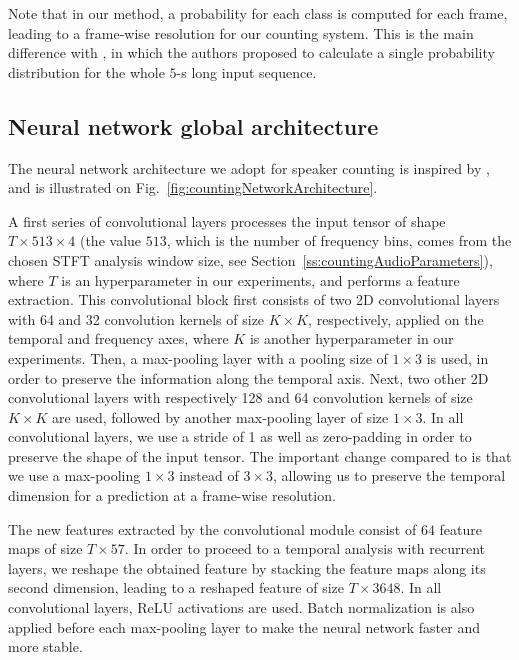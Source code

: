 Note that in our method, a probability for each class is computed for each frame, leading to a frame-wise resolution for our counting system. This is the main difference with \cite{stoter_classification_2018}, in which the authors proposed to calculate a single probability distribution for the whole $5$-s long input sequence.

\subsection{Neural network global architecture}
\label{ss:countingNetworkArchitecture}

The neural network architecture we adopt for speaker counting is inspired by \cite{stoter_countnet:_2019}, and is illustrated on Fig.~\ref{fig:countingNetworkArchitecture}.

A first series of convolutional layers processes the input tensor of shape $T \times 513 \times 4$ (the value $513$, which is the number of frequency bins, comes from the chosen STFT analysis window size, see Section~\ref{ss:countingAudioParameters}), where $T$ is an hyperparameter in our experiments, and performs a feature extraction. This convolutional block first consists of two 2D convolutional layers with 64 and 32 convolution kernels of size $K \times K$, respectively, applied on the temporal and frequency axes, where $K$ is another hyperparameter in our experiments. Then, a max-pooling layer with a pooling size of $1 \times 3$ is used, in order to preserve the information along the temporal axis. Next, two other 2D convolutional layers with respectively 128 and 64 convolution kernels of size $K \times K$ are used, followed by another max-pooling layer of size $1 \times 3$. In all convolutional layers, we use a stride of 1 as well as zero-padding in order to preserve the shape of the input tensor. The important change compared to \cite{stoter_countnet:_2019} is that we use a max-pooling $1 \times 3$ instead of $3 \times 3$, allowing us to preserve the temporal dimension for a prediction at a frame-wise resolution.

The new features extracted by the convolutional module consist of $64$ feature maps of size $T \times 57$. In order to proceed to a temporal analysis with recurrent layers, we reshape the obtained feature by stacking the feature maps along its second dimension, leading to a reshaped feature of size $T \times 3648$. In all convolutional layers, ReLU activations are used. Batch normalization is also applied before each max-pooling layer to make the neural network faster and more stable.

